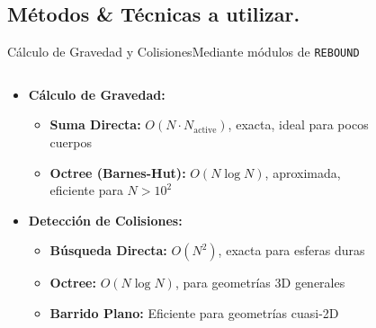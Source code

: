 \subsection[Métodos \& Técnicas]{Métodos \& Técnicas a utilizar.}

\begin{frame}{Cálculo de Gravedad y Colisiones}{Mediante módulos de \texttt{REBOUND}}
    \begin{columns}
        \begin{column}{0.6\textwidth}
            \small
            \begin{itemize}
                \item \textbf{Cálculo de Gravedad:}
                \begin{itemize}
                    \item \textbf{Suma Directa:} $O(N \cdot N_{\text{active}})$, exacta, ideal para pocos cuerpos
                    \item \textbf{Octree (Barnes-Hut):} $O(N \log N)$, aproximada, eficiente para $N > 10^2$
                \end{itemize}
                \item \textbf{Detección de Colisiones:}
                \begin{itemize}
                    \item \textbf{Búsqueda Directa:} $O(N^2)$, exacta para esferas duras
                    \item \textbf{Octree:} $O(N \log N)$, para geometrías 3D generales
                    \item \textbf{Barrido Plano:} Eficiente para geometrías cuasi-2D
                \end{itemize}
            \end{itemize}
        \end{column}
        \begin{column}{0.4\textwidth}
            \centering
            \begin{figure}[H]
                \centering
\end{figure}
\end{column}
\end{columns}
\end{frame}

